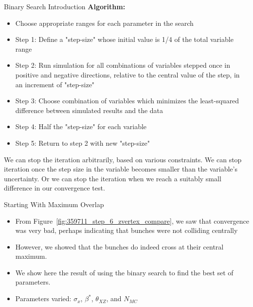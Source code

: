 \begin{frame}{Binary Search Introduction}
\textbf{Algorithm:}
\begin{itemize}
	\item Choose appropriate ranges for each parameter in the search 
	\item Step 1: Define a "step-size" whose initial value is 1/4 of the total
		variable range
	\item Step 2: Run simulation for all combinations of variables stepped once
		in positive and negative directions, relative to the central value of the
		step, in an increment of "step-size"
	\item Step 3: Choose combination of variables which minimizes the
		least-squared difference between simulated results and the data
	\item Step 4: Half the "step-size" for each variable
	\item Step 5: Return to step 2 with new "step-size"
\end{itemize}
We can stop the iteration arbitrarily, based on various constraints.
We can stop iteration once the step size in the variable becomes
smaller than the variable's uncertainty. Or we can stop the iteration when we
reach a suitably small difference in our convergence test.
\end{frame}

\begin{frame}{ Starting With Maximum Overlap }
	\begin{itemize}
		\item From Figure~\ref{fig:359711_step_6_zvertex_compare}, we saw that
			convergence was very bad, perhaps indicating that bunches were not
			colliding centrally 
		\item However, we showed that the bunches do indeed cross at their central
			maximum.
		\item We show here the result of using the binary search to find the best
			set of parameters.
		\item Parameters varied: $\sigma_{x}$, $\beta^{*}$, $\theta_{XZ}$, and $N_{MC}$
	\end{itemize}
\end{frame}


